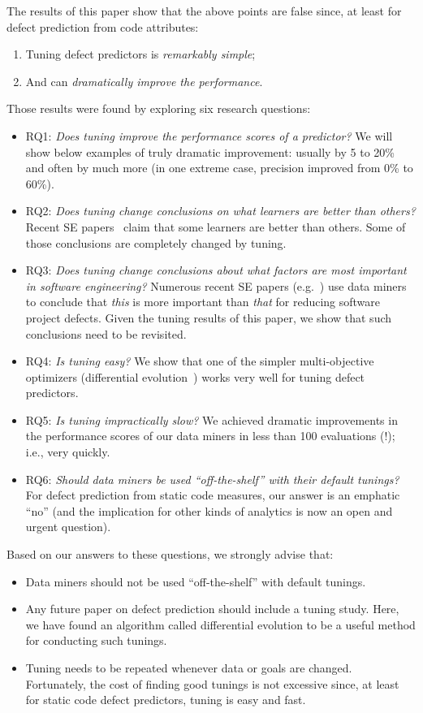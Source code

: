 \documentclass[final,twocolumn,5p]{elsarticle}
\newcommand{\bi}{\begin{itemize}[leftmargin=0.4cm]}
\newcommand{\ei}{\end{itemize}}
\newcommand{\be}{\begin{enumerate}}
\newcommand{\ee}{\end{enumerate}}
\begin{document}
The results of this paper show that the above points are
false since, at least for
defect prediction from  code attributes:
\be
\item
Tuning  defect predictors is {\em remarkably simple};
\item
And can {\em dramatically improve the performance}. 
\ee
Those results were found by   exploring six research questions:
\bi
\item RQ1: {\em Does   tuning    improve the performance scores of a predictor?} We will show below
 examples of truly dramatic improvement:
 usually by 5 to 20\% and often by much more (in one extreme case,  precision improved from 0\% to 60\%).
\item RQ2: {\em Does tuning change conclusions on what learners are better than others?} 
Recent SE papers~\cite{lessmann2008benchmarking,hall11} claim that some learners are better than others. 
Some of those conclusions are completely changed by tuning. 
\item RQ3: {\em Does tuning change conclusions about what factors are most important in software engineering?} Numerous recent SE papers (e.g.~\cite{bell2013limited,rahman2013how,me02k,Moser:2008,zimmermann2007predicting,%
herzig2013predicting}) use data miners to conclude that {\em this}
is more important than {\em that} for reducing software project defects.
Given the  tuning results of this paper, we show that such conclusions need to be revisited.
\item  RQ4: {\em Is tuning easy?} We show that one of the simpler multi-objective optimizers
(differential evolution~\cite{storn1997differential}) works very well for tuning defect predictors. 
\item RQ5: {\em Is tuning impractically slow?} We achieved dramatic improvements in the performance scores
of our data miners in less than 100 evaluations (!); i.e., very
quickly.
\item RQ6: {\em Should data miners be used ``off-the-shelf'' with their default tunings?} 
For defect prediction from static code measures, our answer is an emphatic ``no'' (and
the implication for other kinds of  analytics is now an open and urgent question).
\ei
Based on our answers to these  questions,  we strongly advise that:
\bi
\item
Data miners should not be used ``off-the-shelf'' with default tunings.
\item
Any future paper on defect prediction should include a 
tuning study. Here, we have found  an algorithm called differential
evolution to be a useful method for conducting such
tunings.
\item
Tuning needs to be repeated
whenever data or goals are changed.
Fortunately, the cost of finding good tunings is not excessive since, at least for
static code defect predictors, tuning is easy and fast.
\ei
\end{document}
